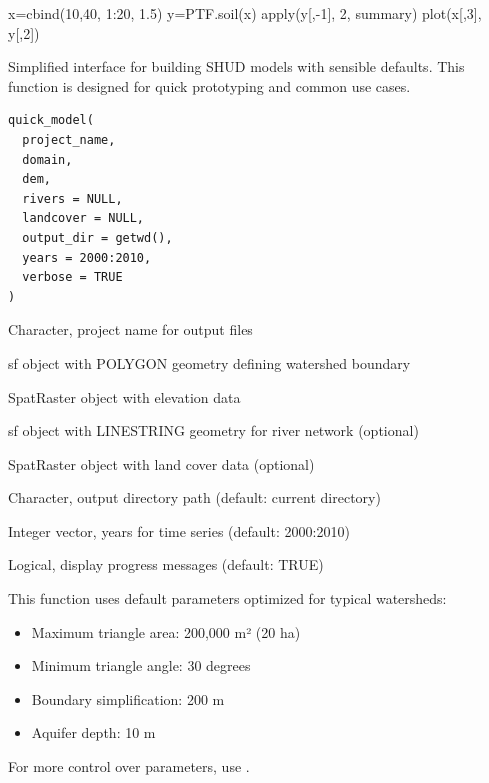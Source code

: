\documentclass[a4paper]{book}
\begin{document}
%
\begin{Examples}
\begin{ExampleCode}
x=cbind(10,40, 1:20, 1.5)
y=PTF.soil(x)
apply(y[,-1], 2, summary)
plot(x[,3], y[,2])
\end{ExampleCode}
\end{Examples}
%
\begin{Description}\relax
Simplified interface for building SHUD models with sensible defaults.
This function is designed for quick prototyping and common use cases.
\end{Description}
%
\begin{Usage}
\begin{verbatim}
quick_model(
  project_name,
  domain,
  dem,
  rivers = NULL,
  landcover = NULL,
  output_dir = getwd(),
  years = 2000:2010,
  verbose = TRUE
)
\end{verbatim}
\end{Usage}
%
\begin{Arguments}
\begin{ldescription}
\item[\code{project\_name}] Character, project name for output files

\item[\code{domain}] sf object with POLYGON geometry defining watershed boundary

\item[\code{dem}] SpatRaster object with elevation data

\item[\code{rivers}] sf object with LINESTRING geometry for river network (optional)

\item[\code{landcover}] SpatRaster object with land cover data (optional)

\item[\code{output\_dir}] Character, output directory path (default: current directory)

\item[\code{years}] Integer vector, years for time series (default: 2000:2010)

\item[\code{verbose}] Logical, display progress messages (default: TRUE)
\end{ldescription}
\end{Arguments}
%
\begin{Details}\relax
This function uses default parameters optimized for typical watersheds:
\begin{itemize}

\item{} Maximum triangle area: 200,000 m² (20 ha)
\item{} Minimum triangle angle: 30 degrees
\item{} Boundary simplification: 200 m
\item{} Aquifer depth: 10 m

\end{itemize}


For more control over parameters, use .
\end{Details}
\end{document}

